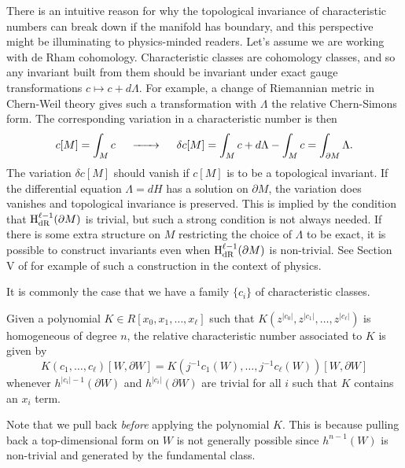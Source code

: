 \begin{remark}
	There is an intuitive reason for why the topological invariance of characteristic numbers can break down if the manifold has boundary, and this perspective might be illuminating to physics-minded readers. Let's assume we are working with de Rham cohomology. Characteristic classes are cohomology classes, and so any invariant built from them should be invariant under exact gauge transformations $c\mapsto c+d\Lambda$. For example, a change of Riemannian metric in Chern-Weil theory gives such a transformation with $\Lambda$ the relative Chern-Simons form. The corresponding variation in a characteristic number is then
	\[
		c[M] = \int_M c \quad\lkxto\quad \delta c[M] = \int_M c+d\Lambda-\int_M c = \int_{\partial M} \Lambda.
	\]
	The variation $\delta c[M]$ should vanish if $c[M]$ is to be a topological invariant. If the differential equation $\Lambda=dH$ has a solution on $\partial M$, the variation does vanishes and topological invariance is preserved. This is implied by the condition that $\operatorname{H}_{\mathrm{dR}}^{\ell-1}(\partial M)$ is trivial, but such a strong condition is not always needed. If there is some extra structure on $M$ restricting the choice of $\Lambda$ to be exact, it is possible to construct invariants even when $\operatorname{H}_{\mathrm{dR}}^{\ell-1}(\partial M)$ is non-trivial. See Section V of \cite{witten1985anomalies} for example of such a construction in the context of physics.
\end{remark}

It is commonly the case that we have a family $\{c_i\}$ of characteristic classes.

\begin{definition}\label{defn:relative-characteristic-number-polynomial}
	Given a polynomial $K\in R[x_0,x_1,\ldots, x_\ell]$ such that $K(z^{|c_0|}, z^{|c_1|}, \ldots, z^{|c_\ell|})$ is homogeneous of degree $n$, the relative characteristic number associated to $K$ is given by
	\[
		K(c_1, \ldots, c_\ell)[W,\partial W] = K(j^{-1}c_1(W), \ldots, j^{-1}c_\ell(W))[W,\partial W]
	\]
	whenever $h^{|c_i|-1}(\partial W)$ and $h^{|c_i|}(\partial W)$ are trivial for all $i$ such that $K$ contains an $x_i$ term.
\end{definition}

\begin{remark}
	Note that we pull back \emph{before} applying the polynomial $K$. This is because pulling back a top-dimensional form on $W$ is not generally possible since $h^{n-1}(W)$ is non-trivial and generated by the fundamental class.
\end{remark}

